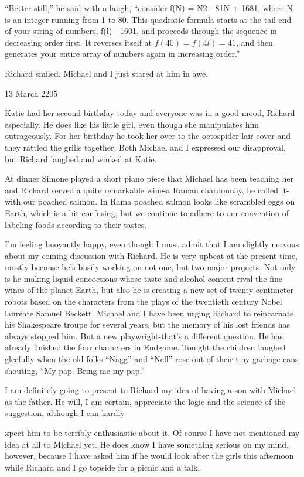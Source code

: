 \documentclass[]{article}
\begin{document}
“Better still,” he said with a laugh, “consider f(N) = N2 - 81N + 1681, where N is an integer running from 1 to 80.  This quadratic formula starts at the tail end of your string of numbers, f(l) - 1601, and proceeds through the sequence in decreasing order first.  It reverses itself at $f(40) = f(4l) = 41$, and then generates your entire array of numbers again in increasing order.”

Richard smiled.  Michael and I just stared at him in awe.

13 March 2205

Katie had her second birthday today and everyone was in a good mood, Richard especially.  He does like his little girl, even though she manipulates him outrageously.  For her birthday he took her over to the octospider lair cover and they rattled the grills together.  Both Michael and I expressed our disapproval, but Richard laughed and winked at Katie.

At dinner Simone played a short piano piece that Michael has been teaching her and Richard served a quite remarkable wine-a Raman chardonnay, he called it-with our poached salmon.  In Rama poached salmon looks like scrambled eggs on Earth, which is a bit confusing, but we continue to adhere to our convention of labeling foods according to their tastes.

I’m feeling buoyantly happy, even though I must admit that I am slightly nervous about my coming discussion with Richard.  He is very upbeat at the present time, mostly because he’s busily working on not one, but two major projects.  Not only is he making liquid concoctions whose taste and alcohol content rival the fine wines of the planet Earth, but also he is creating a new set of twenty-centimeter robots based on the characters from the plays of the twentieth century Nobel laureate Samuel Beckett.  Michael and I have been urging Richard to reincarnate his Shakespeare troupe for several years, but the memory of his lost friends has always stopped him.  But a new playwright-that’s a different question.  He has already finished the four characters in Endgame.  Tonight the children laughed gleefully when the old folks “Nagg” and “Nell” rose out of their tiny garbage cans shouting, “My pap.  Bring me my pap.”

I am definitely going to present to Richard my idea of having a son with Michael as the father.  He will, I am certain, appreciate the logic and the science of the suggestion, although I can hardly

xpect him to be terribly enthusiastic about it.  Of course I have not mentioned my idea at all to Michael yet.  He does know I have something serious on my mind, however, because I have asked him if he would look after the girls this afternoon while Richard and I go topside for a picnic and a talk.
\end{document}
